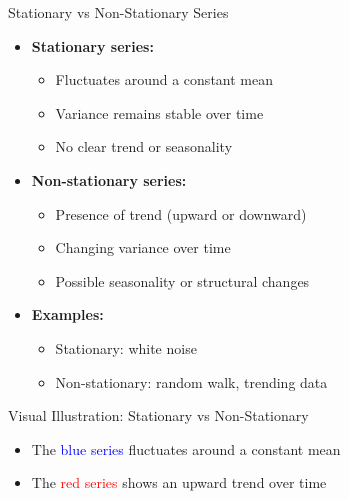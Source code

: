 \documentclass[aspectratio=169]{beamer}
\begin{document}
\begin{frame}{Stationary vs Non-Stationary Series}
\begin{itemize}
    \item \textbf{Stationary series:}
    \begin{itemize}
        \item Fluctuates around a constant mean
        \item Variance remains stable over time
        \item No clear trend or seasonality
    \end{itemize}
    
    \vspace{0.4cm}
    
    \item \textbf{Non-stationary series:}
    \begin{itemize}
        \item Presence of trend (upward or downward)
        \item Changing variance over time
        \item Possible seasonality or structural changes
    \end{itemize}
    
    \vspace{0.4cm}
    
    \item \textbf{Examples:}
    \begin{itemize}
        \item Stationary: white noise
        \item Non-stationary: random walk, trending data
    \end{itemize}
\end{itemize}
\end{frame}

\begin{frame}{Visual Illustration: Stationary vs Non-Stationary}
\centering
{}

\vspace{0.2cm}
\begin{itemize}
    \item The \textcolor{blue}{blue series} fluctuates around a constant mean
    \item The \textcolor{red}{red series} shows an upward trend over time
\end{itemize}
\end{frame}
\end{document}
